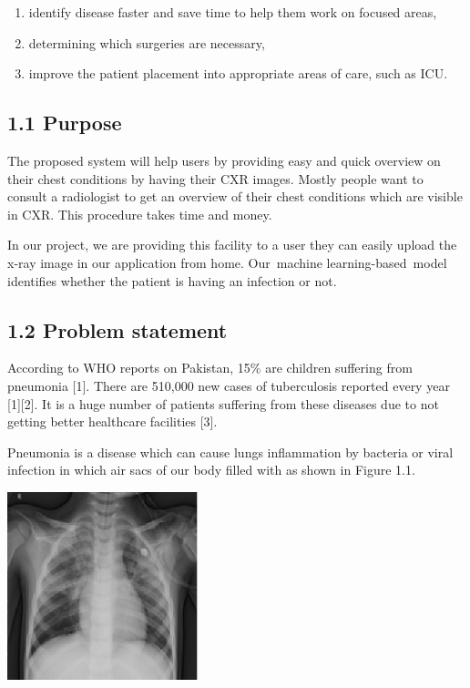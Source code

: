 \documentclass{article} %
\begin{document}
\begin{enumerate}
\item  identify disease faster and save time to help them work on focused areas, 

\item  determining which surgeries are necessary, 

\item  improve the patient placement into appropriate areas of care, such as ICU.
\end{enumerate}

\noindent 
\subsection{1.1 Purpose}

\noindent The proposed system will help users by providing easy and quick overview on their chest conditions by having their CXR images. Mostly people want to consult a radiologist to get an overview of their chest conditions which are visible in CXR. This procedure takes time and money.

\noindent In our project, we are providing this facility to a user they can easily upload the x-ray image in our application from home. Our~machine learning-based~model identifies whether the patient is having an infection or not.

\noindent 
\subsection{1.2 Problem statement}

\noindent According to WHO reports on Pakistan, 15\% are children suffering from pneumonia [1]. There are 510,000 new cases of tuberculosis reported every year [1][2]. It is a huge number of patients suffering from these diseases due to not getting better healthcare facilities [3].

\noindent Pneumonia is a disease which can cause lungs inflammation by bacteria or viral infection in which air sacs of our body filled with as shown in Figure 1.1. 

\noindent \includegraphics*[width=2.19in, height=2.16in, keepaspectratio=false]{image13}\textbf{}
\end{document}
